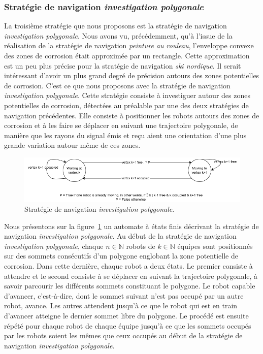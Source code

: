\documentclass[francais,RandD]{rapportPFE}
\begin{document}
			\subsubsection*{Stratégie de navigation \textit{investigation polygonale}}
				La troisième stratégie que nous proposons est la stratégie de navigation \textit{investigation polygonale}.
				Nous avons vu,  précédemment, qu'à l'issue de la réalisation de la stratégie de navigation \textit{peinture au rouleau}, l'enveloppe convexe des zones de corrosion était approximée par un rectangle.
				Cette approximation est un peu plus précise pour la stratégie de navigation \textit{ski nordique}.
				Il serait intéressant d'avoir un plus grand degré de précision autours des zones potentielles de corrosion.
				C'est ce que nous proposons avec la stratégie de navigation \textit{investigation polygonale}.
				Cette stratégie consiste à investiguer autour des zones potentielles de corrosion, détectées au préalable par une des deux stratégies de navigation précédentes.
				Elle consiste à positionner les robots autours des zones de corrosion et à les faire se déplacer en suivant une trajectoire polygonale, de manière que les rayons du signal émis et reçu aient une orientation d'une plus grande variation autour même de ces zones.

				\begin{figure}[h!]
					\centering
					\includegraphics[scale=0.6]{graphics/automat_poly.png}
					\caption{Stratégie de navigation \textit{investigation polygonale}.}
					\label{fig:automat}
				\end{figure}

				Nous présentons sur la figure~\ref{fig:automat} un automate à états finis décrivant la stratégie de navigation \textit{investigation polygonale}.
				Au début de la stratégie de navigation \textit{investigation polygonale}, chaque $n \in \mathbb{N}$ robots de $k \in \mathbb{N}$ équipes sont positionnés sur des sommets consécutifs d'un polygone englobant la zone potentielle de corrosion.
				Dans cette dernière, chaque robot a deux états.
				Le premier consiste à attendre et le second consiste à se déplacer en suivant la trajectoire polygonale, à savoir parcourir les différents sommets constituant le polygone.
				Le robot capable d'avancer, c'est-à-dire, dont le sommet suivant n'est pas occupé par un autre robot, avance.
				Les autres attendent jusqu'à ce que le robot qui est en train d'avancer atteigne le dernier sommet libre du polygone.
				Le procédé est ensuite répété pour chaque robot de chaque équipe jusqu'à ce que les sommets occupés par les robots soient les mêmes que ceux occupés au début de la stratégie de navigation \textit{investigation polygonale}.
\end{document}
